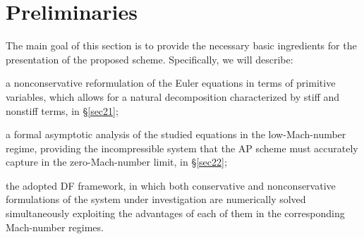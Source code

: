 \documentclass[A4paper,12pt,twoside]{article}
\numberwithin{equation}{section}
\numberwithin{figure}{section}
\numberwithin{table}{section}
\newcommand{\lore}[1]{{\leavevmode\color{red} #1}}
\begin{document}
\section{Preliminaries}\label{sec2}
\lore{The main goal of this section is to provide the necessary basic ingredients for the presentation of the proposed scheme. Specifically, we will describe:}
\begin{asparaitem}
\item
a \lore{nonconservative} reformulation of the Euler equations in terms of primitive variables, which allows for a natural decomposition \lore{characterized by stiff and nonstiff terms, in \S\ref{sec21}}; %
\item
a formal asymptotic analysis of the studied \lore{equations} in the low-Mach-number regime, \lore{providing} the incompressible system that the AP scheme must accurately \lore{capture} in the zero-Mach-number limit, \lore{in \S\ref{sec22}};
\item 
\lore{the adopted} DF framework, in which both conservative and nonconservative %
formulations of the %
system \lore{under investigation} are numerically solved
simultaneously \lore{exploiting} %
the advantages of each of them in the corresponding Mach-number regimes.
\end{asparaitem}
\end{document}

